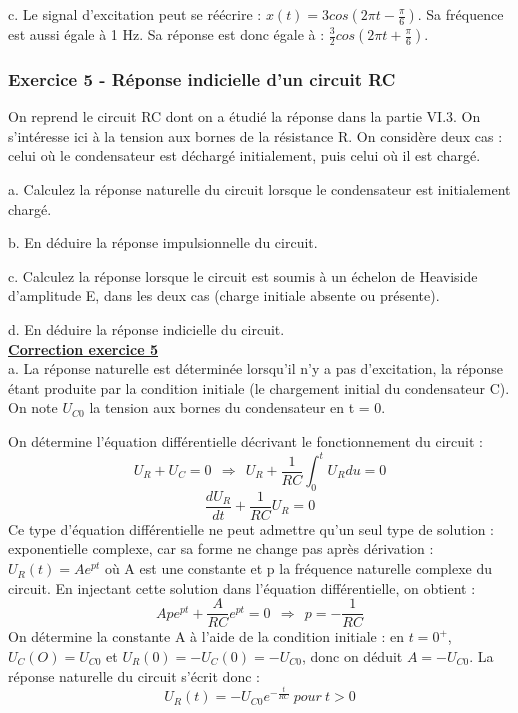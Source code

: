 \documentclass[11pt]{report}
\begin{document}
 	c. Le signal d'excitation peut se réécrire : $x(t)=3cos(2\pi t-\frac{\pi}{6})$. Sa fréquence est aussi égale à 1 Hz. Sa réponse est donc égale à : $\frac{3}{2}cos(2\pi t+\frac{\pi}{6})$.\\
 	
 	
 	
 
  	
 	\subsubsection{Exercice 5 - Réponse indicielle d'un circuit RC}
 	
 	On reprend le circuit RC dont on a étudié la réponse dans la partie VI.3. On s'intéresse ici à la tension aux bornes de la résistance R. On considère deux cas : celui où le condensateur est déchargé initialement, puis celui où il est chargé. 
 	
 	a. Calculez la réponse naturelle du circuit lorsque le condensateur est initialement chargé.
 	
 	b. En déduire la réponse impulsionnelle du circuit.
 	
 	c. Calculez la réponse lorsque le circuit est soumis à un échelon de Heaviside d'amplitude E, dans les deux cas (charge initiale absente ou présente).
 	
 	d. En déduire la réponse indicielle du circuit.\\
 	
 	\textbf{\underline{Correction exercice 5}}\\
 	
 	a. La réponse naturelle est déterminée lorsqu'il n'y a pas d'excitation, la réponse étant produite par la condition initiale (le chargement initial du condensateur C). On note $U_{C0}$ la tension aux bornes du condensateur en t = 0. 
 	
 	On détermine l'équation différentielle décrivant le fonctionnement du circuit :
 	\begin{equation*}
 	U_R+U_C = 0~~\Rightarrow~~U_R+\frac{1}{RC}\int_{0}^{t}U_Rdu=0
 	\end{equation*}
 	\begin{equation*}
 	\frac{dU_R}{dt}+\frac{1}{RC}U_R=0
 	\end{equation*}
 	Ce type d'équation différentielle ne peut admettre qu'un seul type de solution : exponentielle complexe, car sa forme ne change pas après dérivation : $U_R(t)=Ae^{pt}$ où A est une constante et p la fréquence naturelle complexe du circuit. En injectant cette solution dans l'équation différentielle, on obtient :
 	\begin{equation*}
 	Ape^{pt}+\frac{A}{RC}e^{pt}=0~~\Rightarrow~~p=-\frac{1}{RC}
 	\end{equation*}
 	On détermine la constante A à l'aide de la condition initiale : en $t = 0^{+}$, $U_C(O)=U_{C0}$ et $U_R(0)=-U_C(0)=-U_{C0}$, donc on déduit $A=-U_{C0}$. La réponse naturelle du circuit s'écrit donc :
 	\begin{equation*}
 	U_R(t)=-U_{C0}e^{-\frac{t}{RC}}~pour~t>0
 	\end{equation*}
 	
\end{document}

